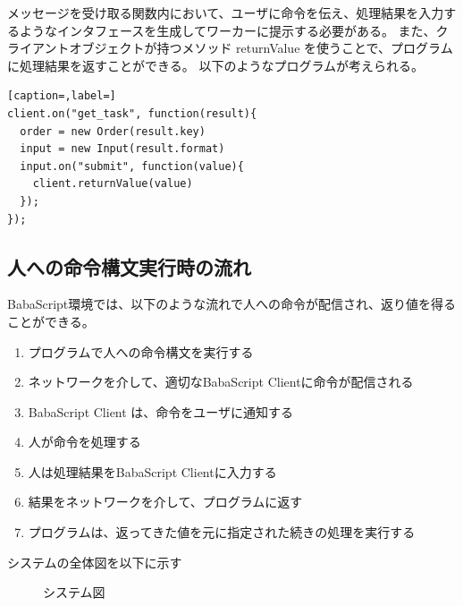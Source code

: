\documentclass{deimj}
\begin{document}
メッセージを受け取る関数内において、ユーザに命令を伝え、処理結果を入力するようなインタフェースを生成してワーカーに提示する必要がある。
また、クライアントオブジェクトが持つメソッド returnValue を使うことで、プログラムに処理結果を返すことができる。
以下のようなプログラムが考えられる。

\begin{lstlisting}[caption=,label=] 
client.on("get_task", function(result){
  order = new Order(result.key)
  input = new Input(result.format)
  input.on("submit", function(value){
    client.returnValue(value)
  });  
});
\end{lstlisting}

  
\subsection{人への命令構文実行時の流れ}
BabaScript環境では、以下のような流れで人への命令が配信され、返り値を得ることができる。

\begin{enumerate}
\item プログラムで人への命令構文を実行する
\item ネットワークを介して、適切なBabaScript Clientに命令が配信される
\item BabaScript Client は、命令をユーザに通知する
\item 人が命令を処理する
\item 人は処理結果をBabaScript Clientに入力する
\item 結果をネットワークを介して、プログラムに返す
\item プログラムは、返ってきた値を元に指定された続きの処理を実行する
\end{enumerate}

システムの全体図を以下に示す

\begin{figure}[tb]
  \begin{center}
    \caption{システム図}
    \label{system}
  \end{center}
\end{figure}
\end{document}
